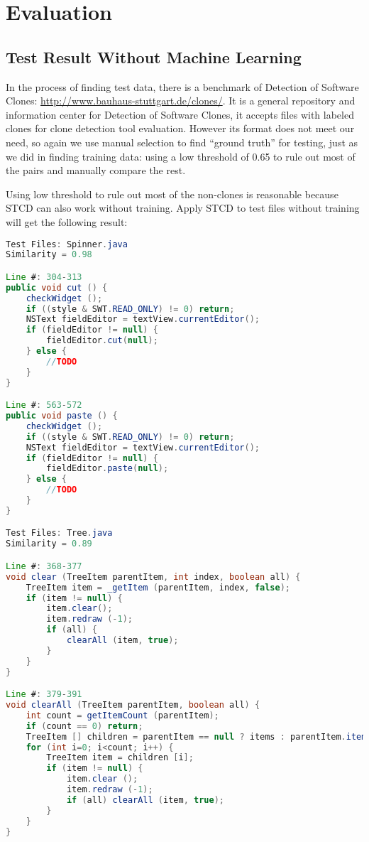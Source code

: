 \documentclass[../main.tex]{subfiles}
\begin{document}
\section{Evaluation}

\subsection{Test Result Without Machine Learning}

In the process of finding test data, there is a benchmark of Detection of Software Clones: {\color{blue} \url{http://www.bauhaus-stuttgart.de/clones/}}. It is a general repository and information center for Detection of Software Clones, it accepts files with labeled clones for clone detection tool evaluation. However its format does not meet our need, so again we use manual selection to find ``ground truth'' for testing, just as we did in finding training data: using a low threshold of 0.65 to rule out most of the pairs and manually compare the rest.

Using low threshold to rule out most of the non-clones is reasonable because STCD can also work without training. Apply STCD to test files without training will get the following result:


\begin{lstlisting}[basicstyle=\footnotesize, language=Java]
Test Files: Spinner.java
Similarity = 0.98

Line #: 304-313
public void cut () {
	checkWidget ();
	if ((style & SWT.READ_ONLY) != 0) return;
	NSText fieldEditor = textView.currentEditor();
	if (fieldEditor != null) {
		fieldEditor.cut(null);
	} else {
		//TODO
	}
}

Line #: 563-572
public void paste () {
	checkWidget ();
	if ((style & SWT.READ_ONLY) != 0) return;
	NSText fieldEditor = textView.currentEditor();
	if (fieldEditor != null) {
		fieldEditor.paste(null);
	} else {
		//TODO
	}
}

Test Files: Tree.java
Similarity = 0.89

Line #: 368-377
void clear (TreeItem parentItem, int index, boolean all) {
	TreeItem item = _getItem (parentItem, index, false);
	if (item != null) {
		item.clear();
		item.redraw (-1);
		if (all) {
			clearAll (item, true);
		}
	}
}

Line #: 379-391
void clearAll (TreeItem parentItem, boolean all) {
	int count = getItemCount (parentItem);
	if (count == 0) return;
	TreeItem [] children = parentItem == null ? items : parentItem.items; 
	for (int i=0; i<count; i++) {
		TreeItem item = children [i];
		if (item != null) {
			item.clear ();
			item.redraw (-1);
			if (all) clearAll (item, true);
		}
	}
}
\end{lstlisting}
\end{document}
